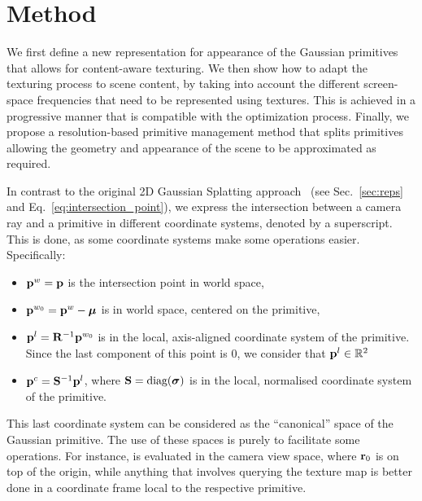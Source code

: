 \section{Method}

We first define a new representation for appearance of the Gaussian primitives that allows for content-aware texturing.
We then show how to adapt the texturing process to scene content,
by taking into account the different screen-space frequencies that need to be represented using textures.
This is achieved in a progressive manner that is compatible with the optimization process.
Finally,
we propose a resolution-based primitive management method that splits primitives allowing the geometry and appearance of the scene to be approximated as required.


In contrast to the original 2D Gaussian Splatting approach~\cite{2dgs} (see
Sec.~\ref{sec:reps} and Eq.~\ref{eq:intersection_point}), we express 
the intersection between a camera ray and a primitive in different coordinate systems, denoted by a superscript.
This is done,
as some coordinate systems make some operations easier.
Specifically:
\begin{itemize}
    \item $\mathbf{p}^w = \mathbf{p}$ is the intersection point in world space,
    \item $\mathbf{p}^{w_0} = \mathbf{p}^w - \boldsymbol{\mu}$ is in world space, centered on the primitive,
    \item $\mathbf{p}^l = \mathbf{R}^{-1}\mathbf{p}^{w_0}$ is in the local, axis-aligned coordinate system of the primitive. Since the last component of this point is 0, we consider that $\mathbf{p}^l \in \mathbb{R}^2$
    \item $\mathbf{p}^{c} = \mathbf{S}^{-1}\mathbf{p}^l$, where $\mathbf{S} = \text{diag}(\boldsymbol{\sigma})$ is in the local, normalised coordinate system of the primitive.
\end{itemize}
This last coordinate system can be considered as the ``canonical'' space of the Gaussian primitive.
The use of these spaces is purely to facilitate some operations.
For instance,  is evaluated in the camera view space,
where $\mathbf{r}_0$ is on top of the origin,
while anything that involves querying the texture map is better done in a coordinate frame local to the respective primitive.

